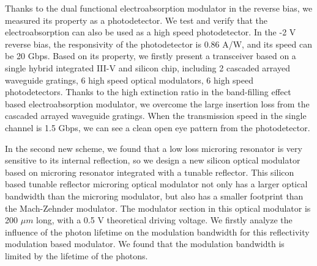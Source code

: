 \begin{englishabstract}
Thanks to the dual functional  electroabsorption modulator in the reverse bias, we measured its property as a photodetector. We test and verify that the electroabsorption can also be used as a high speed photodetector. In the -2 V reverse bias, the responsivity of the photodetector is 0.86 A/W, and its speed can be 20 Gbps. Based on its property, we firstly present a transceiver based on a single hybrid integrated III-V and silicon chip, including 2 cascaded arrayed waveguide gratings, 6 high speed optical modulators, 6 high speed photodetectors. Thanks to the high extinction ratio in the band-filling effect based electroabsorption modulator, we overcome the large insertion loss from the cascaded arrayed waveguide gratings. When the transmission speed in the single channel is 1.5 Gbps, we can see a clean open eye pattern from the photodetector.

In the second new scheme, we found that a low loss microring resonator is very sensitive to its internal reflection, so we design a new silicon optical modulator based on microring resonator integrated with a tunable reflector. This silicon based tunable reflector microring optical modulator not only has a larger optical bandwidth than the microring modulator, but also has a smaller footprint than the Mach-Zehnder modulator. The modulator section in this optical modulator is 200 $\mu m$ long, with a 0.5 V theoretical driving voltage. We firstly analyze the influence of the photon lifetime on the modulation bandwidth for this reflectivity modulation based modulator. We found that the modulation bandwidth is limited by the lifetime of the photons.


\end{englishabstract}
